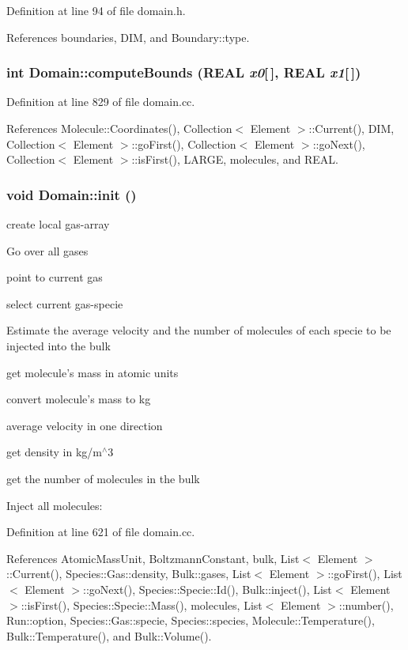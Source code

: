 Definition at line 94 of file domain.h.

References boundaries, DIM, and Boundary::type.\hypertarget{classDomain_d648b8279c930c23ae094160bda427ac}{
\subsubsection[{computeBounds}]{\setlength{\rightskip}{0pt plus 5cm}int Domain::computeBounds (REAL {\em x0}\mbox{[}$\,$\mbox{]}, \/  REAL {\em x1}\mbox{[}$\,$\mbox{]})}}
\label{classDomain_d648b8279c930c23ae094160bda427ac}




Definition at line 829 of file domain.cc.

References Molecule::Coordinates(), Collection$<$ Element $>$::Current(), DIM, Collection$<$ Element $>$::goFirst(), Collection$<$ Element $>$::goNext(), Collection$<$ Element $>$::isFirst(), LARGE, molecules, and REAL.\hypertarget{classDomain_12ba0b28c95d771109948d996ac25ef4}{
\subsubsection[{init}]{\setlength{\rightskip}{0pt plus 5cm}void Domain::init ()}}
\label{classDomain_12ba0b28c95d771109948d996ac25ef4}




create local gas-array

Go over all gases

point to current gas

select current gas-specie

Estimate the average velocity and the number of molecules of each specie to be injected into the bulk

get molecule's mass in atomic units

convert molecule's mass to kg

average velocity in one direction

get density in kg/m$^\wedge$3

get the number of molecules in the bulk

Inject all molecules: 

Definition at line 621 of file domain.cc.

References AtomicMassUnit, BoltzmannConstant, bulk, List$<$ Element $>$::Current(), Species::Gas::density, Bulk::gases, List$<$ Element $>$::goFirst(), List$<$ Element $>$::goNext(), Species::Specie::Id(), Bulk::inject(), List$<$ Element $>$::isFirst(), Species::Specie::Mass(), molecules, List$<$ Element $>$::number(), Run::option, Species::Gas::specie, Species::species, Molecule::Temperature(), Bulk::Temperature(), and Bulk::Volume().

